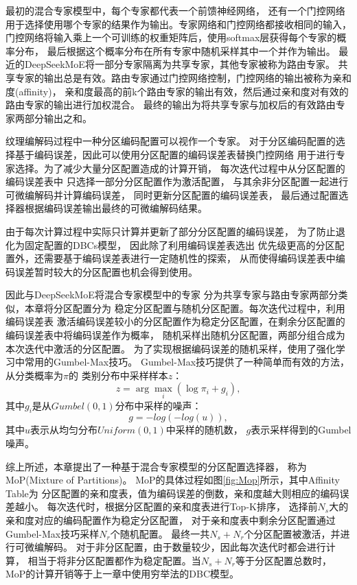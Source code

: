 最初的混合专家模型\cite{jacobs1991adaptive}中，每个专家都代表一个前馈神经网络，
还有一个门控网络用于选择使用哪个专家的结果作为输出。专家网络和门控网络都接收相同的输入，
门控网络将输入乘上一个可训练的权重矩阵后，使用softmax层获得每个专家的概率分布，
最后根据这个概率分布在所有专家中随机采样其中一个并作为输出。
最近的DeepSeekMoE\cite{dai2024deepseekmoe}将一部分专家隔离为共享专家，其他专家被称为路由专家。
共享专家的输出总是有效。路由专家通过门控网络控制，门控网络的输出被称为亲和度(affinity)，
亲和度最高的前k个路由专家的输出有效，然后通过亲和度对有效的路由专家的输出进行加权混合。
最终的输出为将共享专家与加权后的有效路由专家两部分输出之和。

纹理编解码过程中一种分区编码配置可以视作一个专家。
对于分区编码配置的选择基于编码误差，因此可以使用分区配置的编码误差表替换门控网络
用于进行专家选择。为了减少大量分区配置造成的计算开销，
每次迭代过程中从分区配置的编码误差表中
只选择一部分分区配置作为激活配置，
与其余非分区配置一起进行可微编解码并计算编码误差，
同时更新分区配置的编码误差表，
最后通过配置选择器根据编码误差输出最终的可微编解码结果。

由于每次计算过程中实际只计算并更新了部分分区配置的编码误差，
为了防止退化为固定配置的DBCs模型，
因此除了利用编码误差表选出
优先级更高的分区配置外，还需要基于编码误差表进行一定随机性的探索，
从而使得编码误差表中编码误差暂时较大的分区配置也机会得到使用。

因此与DeepSeekMoE\cite{dai2024deepseekmoe}将混合专家模型中的专家
分为共享专家与路由专家两部分类似，本章将分区配置分为
稳定分区配置与随机分区配置。每次迭代过程中，利用编码误差表
激活编码误差较小的分区配置作为稳定分区配置，在剩余分区配置的编码误差表中将编码误差作为概率，
随机采样出随机分区配置，两部分组合成为本次迭代中激活的分区配置。
为了实现根据编码误差的随机采样，使用了强化学习中常用的Gumbel-Max技巧\cite{jang2016categorical}。
Gumbel-Max技巧提供了一种简单而有效的方法，从分类概率为$\pi$的
类别分布中采样样本$z$：
\begin{equation}
z = \arg\max_i \left( \log\pi_i + g_i \right),
\end{equation}
其中$g_i$是从$Gumbel(0, 1)$分布中采样的噪声：
\begin{equation}
    g = -log(-log(u)),
\end{equation}
其中$u$表示从均匀分布$Uniform(0, 1)$中采样的随机数，
$g$表示采样得到的Gumbel噪声。

综上所述，本章提出了一种基于混合专家模型的分区配置选择器，
称为MoP(Mixture of Partitions)。
MoP的具体过程如图\ref{fig:Mop}所示，其中Affinity Table为
分区配置的亲和度表，值为编码误差的倒数，亲和度越大则相应的编码误差越小。
每次迭代时，根据分区配置的亲和度表进行Top-K排序，
选择前$N_s$大的亲和度对应的编码配置作为稳定分区配置，
对于亲和度表中剩余分区配置通过Gumbel-Max技巧采样$N_r$个随机配置。
最终一共$N_s+N_r$个分区配置被激活，并进行可微编解码。
对于非分区配置，由于数量较少，因此每次迭代时都会进行计算，
相当于将非分区配置都作为稳定配置。当$N_s+N_r$等于分区配置总数时，
MoP的计算开销等于上一章中使用穷举法的DBC模型。

